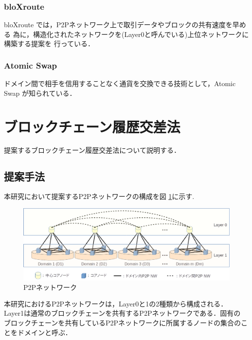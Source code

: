 \documentclass[a4paper,12pt]{jsarticle}
\begin{document}
      \subsubsection{bloXroute}
bloXroute \cite{bloX} では，P2Pネットワーク上で取引データやブロックの共有速度を早める
為に，構造化されたネットワークを(Layer0と呼んでいる)上位ネットワークに構築する提案を
行っている．

      \subsubsection{Atomic Swap}
ドメイン間で相手を信用することなく通貨を交換できる技術として，Atomic Swap \cite{atomicswap}
が知られている．

\newpage
\section{ブロックチェーン履歴交差法}
提案するブロックチェーン履歴交差法について説明する．
  \subsection{提案手法}
\label{teian}

本研究において提案するP2Pネットワークの構成を図 \ref{fig:p2p}に示す. 
%
%
\begin{figure}[H]%
  \begin{center}
    \includegraphics[width=130mm]{pht/p2p_network_image_r1.eps}
  \end{center}
  \caption{P2Pネットワーク}
  \label{fig:p2p}
\end{figure}


本研究におけるP2Pネットワークは，Layer0と1の2種類から構成される．
Layer1は通常のブロックチェーンを共有するP2Pネットワークである．固有の
ブロックチェーンを共有しているP2Pネットワークに所属するノードの集合のことをドメインと呼ぶ．
\end{document}

